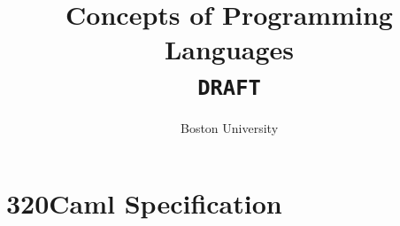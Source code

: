 \documentclass[10pt]{report}
\title{Concepts of Programming Languages
  \\
  \texttt{DRAFT}
}
\author{Boston University}
\begin{document}
\chapter{320Caml Specification}

\end{document}

